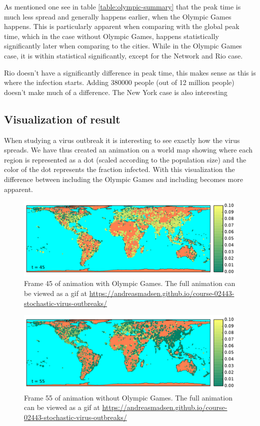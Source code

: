 As mentioned one see in table \ref{table:olympic-summary} that the peak time is much less spread and generally happens earlier, when the Olympic Games happens. This is particularly apparent when comparing with the global peak time, which in the case without Olympic Games, happens statistically significantly later when comparing to the cities. While in the Olympic Games case, it is within statistical significantly, except for the Network and Rio case.

Rio doesn't have a significantly difference in peak time, this makes sense as this is where the infection starts. Adding 380000 people (out of 12 million people) doesn't make much of a difference. The New York case is also interesting

\subsection{Visualization of result}
When studying a virus outbreak it is interesting to see exactly how the virus spreads. We have thus created an animation on a world map showing where each region is represented as a dot (scaled according to the population size) and the color of the dot represents the fraction infected. With this visualization the difference between including the Olympic Games and including becomes more apparent.

\begin{figure}[H]
	\centering
	\includegraphics[width=1.0 \linewidth]{plots/gifs/frames/rio-45}
	\caption{Frame 45 of animation with Olympic Games. The full animation can be viewed as a gif at
		\url{https://andreasmadsen.github.io/course-02443-stochastic-virus-outbreaks/}}
\end{figure}

\begin{figure}[H]
	\centering
	\includegraphics[width=1.0 \linewidth]{plots/gifs/frames/noRio-55}
	\caption{Frame 55 of animation without Olympic Games. The full animation can be viewed as a gif at
		\url{https://andreasmadsen.github.io/course-02443-stochastic-virus-outbreaks/}}
\end{figure}


